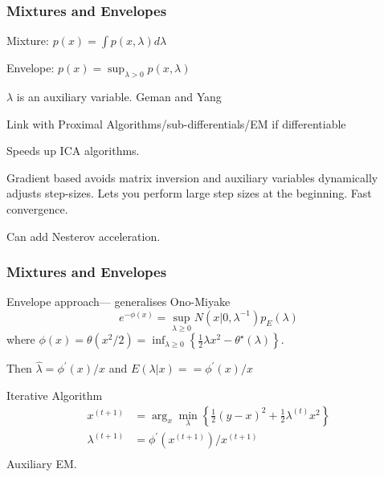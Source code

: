 \documentclass{beamer}
\newcommand{\half}{ {\scriptstyle \frac{1}{2} }  }
\begin{document}
\begin{frame}
\frametitle{Mixtures and Envelopes}
\footnotesize

Mixture: $ p( x  ) = \int p( x , \lambda ) d \lambda $

\vspace{0.1in}
Envelope: $ p( x) = \sup_{\lambda > 0} p( x , \lambda )  $ 

\vspace{0.1in}
$ \lambda $ is an  auxiliary variable. Geman and Yang 

\vspace{0.1in}
Link with Proximal Algorithms/sub-differentials/EM if differentiable

\vspace{0.1in}
Speeds up ICA algorithms.  

\vspace{0.1in}
Gradient based avoids matrix inversion and auxiliary variables dynamically adjusts step-sizes.
Lets you perform large step sizes at the beginning. Fast convergence.

\vspace{0.1in}
Can add Nesterov acceleration. 

\end{frame}
\begin{frame}
\frametitle{Mixtures and Envelopes}
\footnotesize

Envelope approach--- generalises Ono-Miyake
$$
e^{ - \phi (x ) } = \sup_{ \lambda \geq 0 } N ( x | 0 , \lambda^{-1} ) p_E ( \lambda ) 
$$
where
$\phi( x ) = \theta ( x^2 / 2 ) = \inf_{\lambda \geq 0 } \left\{ \half \lambda x^2 - \theta^\star ( \lambda ) \right\} $.

\vspace{0.1in}
Then $ \hat{\lambda} = \phi^\prime ( x ) / x $ and $ E( \lambda | x ) =  = \phi^\prime ( x ) / x $ 

\vspace{0.1in}
Iterative Algorithm
\begin{align*}
x^{(t+1)} &= \arg_x \min_\lambda \left\{ \half ( y-x )^2 + \half \lambda^{(t)}  x^2 \right \}  \\
\lambda^{(t+1)} &=  \phi^\prime ( x^{(t+1)} ) / x^{(t+1)} \\
\end{align*}
Auxiliary EM. 

\end{frame}
\end{document}
